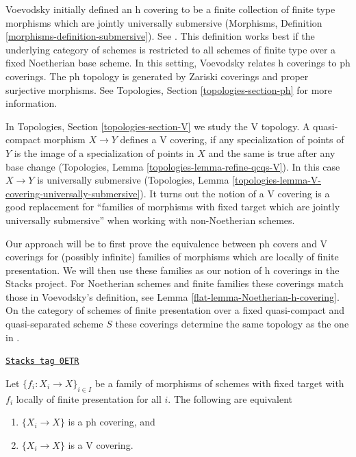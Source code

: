\medskip\noindent
Voevodsky initially defined an
h covering to be a finite collection of finite type morphisms which are
jointly universally submersive (Morphisms, Definition
\ref{morphisms-definition-submersive}). See \cite[Definition 3.1.2]{Voevodsky}.
This definition works best if the underlying category of schemes is
restricted to all schemes of finite type over a fixed Noetherian base scheme.
In this setting, Voevodsky relates h coverings to ph coverings.
The ph topology is generated by Zariski coverings and proper
surjective morphisms. See Topologies, Section \ref{topologies-section-ph}
for more information.

\medskip\noindent
In Topologies, Section \ref{topologies-section-V} we study the V topology.
A quasi-compact morphism $X \to Y$ defines a V covering, if any specialization
of points of $Y$ is the image of a specialization of points in $X$
and the same is true after any base change
(Topologies, Lemma \ref{topologies-lemma-refine-qcqs-V}).
In this case $X \to Y$ is universally submersive
(Topologies, Lemma \ref{topologies-lemma-V-covering-universally-submersive}).
It turns out the notion of a V covering is a good replacement for
``families of morphisms with fixed target which are
jointly universally submersive'' when working with non-Noetherian schemes.

\medskip\noindent
Our approach will be to first prove the equivalence between ph covers and
V coverings for (possibly infinite) families of morphisms which are
locally of finite presentation. We will then use these families
as our notion of h coverings in the Stacks project.
For Noetherian schemes and finite families these coverings
match those in Voevodsky's definition, see
Lemma \ref{flat-lemma-Noetherian-h-covering}.
On the category of schemes of finite presentation over a fixed
quasi-compact and quasi-separated scheme $S$ these coverings
determine the same topology as the one in \cite[Definition 2.7]{Witt-Grass}.

\begin{lemma}
\label{flat-lemma-equivalence-h-v-locally-finite-presentation}
\href{https://stacks.math.columbia.edu/tag/0ETR}{\texttt{Stacks tag 0ETR}}

Let $\{f_i : X_i \to X\}_{i \in I}$ be a family of morphisms
of schemes with fixed target with $f_i$ locally of finite
presentation for all $i$. The following are equivalent
\begin{enumerate}
\item $\{X_i \to X\}$ is a ph covering, and
\item $\{X_i \to X\}$ is a V covering.
\end{enumerate}
\end{lemma}

